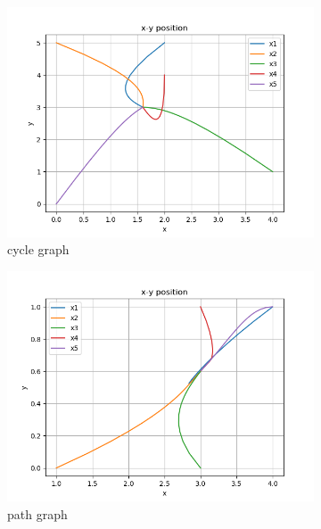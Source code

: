 \documentclass{article}
\begin{document}
\begin{problem}
\begin{figure}[!ht]
        \begin{subfigure}{0.4\textwidth}
            \includegraphics[width=\textwidth]{./img/p1xyposition_cycle_graph_5.png}
            \caption{cycle graph}
        \end{subfigure}
        \begin{subfigure}{0.4\textwidth}
            \includegraphics[width=\textwidth]{./img/p1xyposition_path_graph_5.png}
            \caption{path graph}
        \end{subfigure}
        \begin{subfigure}{0.4\textwidth}

\end{subfigure}
\end{figure}
\end{problem}
\end{document}
